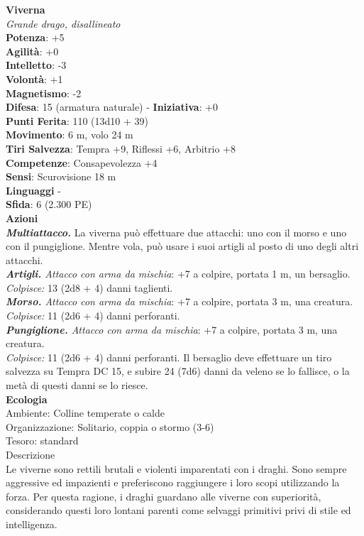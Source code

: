 \begin{multicols}{2}
\medskip\textbf{Viverna}\\
\emph{Grande drago, disallineato}\\
\textbf{Potenza}: +5\\
\textbf{Agilità}: +0\\
\textbf{Intelletto}: -3\\
\textbf{Volontà}: +1\\
\textbf{Magnetismo}: -2\\
\textbf{Difesa}: 15 (armatura naturale) - \textbf{Iniziativa}: +0\\
\textbf{Punti Ferita}: 110 (13d10 + 39)\\
\textbf{Movimento}: 6 m, volo 24 m\\
\textbf{Tiri Salvezza}: Tempra +9, Riflessi +6, Arbitrio +8\\
\textbf{Competenze}: Consapevolezza +4\\
\textbf{Sensi}: Scurovisione 18 m\\
\textbf{Linguaggi} -\\
\textbf{Sfida}: 6 (2.300 PE)\smallskip\\
\smallskip\textbf{Azioni}\\
\emph{\textbf{Multiattacco.}} La viverna può effettuare due attacchi: uno con il morso e uno con il pungiglione. Mentre vola, può usare i suoi artigli al posto di uno degli altri attacchi.\\
\emph{\textbf{Artigli.} Attacco con arma da mischia}: +7 a colpire, portata 1 m, un bersaglio.\\
\emph{Colpisce:} 13 (2d8 + 4) danni taglienti.\\
\emph{\textbf{Morso.} Attacco con arma da mischia}: +7 a colpire, portata 3 m, una creatura.\\
\emph{Colpisce:} 11 (2d6 + 4) danni perforanti.\\
\emph{\textbf{Pungiglione.} Attacco con arma da mischia}: +7 a colpire, portata 3 m, una creatura.\\
\emph{Colpisce:} 11 (2d6 + 4) danni perforanti. Il bersaglio deve effettuare un tiro salvezza su Tempra DC 15, e subire 24 (7d6) danni da veleno se lo fallisce, o la metà di questi danni se lo riesce.\\
\textbf{Ecologia}\\
Ambiente: Colline temperate o calde\\
Organizzazione: Solitario, coppia o stormo (3-6)\\
Tesoro: standard\\
Descrizione\\
Le viverne sono rettili brutali e violenti imparentati con i draghi. Sono sempre aggressive ed impazienti e preferiscono raggiungere i loro scopi utilizzando la forza. Per questa ragione, i draghi guardano alle viverne con superiorità, considerando questi loro lontani parenti come selvaggi primitivi privi di stile ed intelligenza.\\


\end{multicols}
